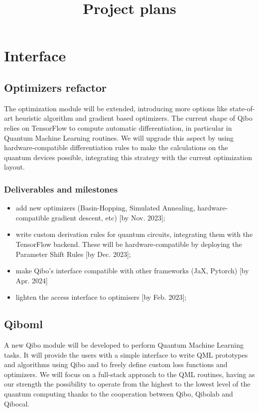 \documentclass[11pt]{article}
\title{Project plans}
\author{}
\date{}
\begin{document}
\maketitle
\tableofcontents

\section{Interface}

\subsection{Optimizers refactor}
The optimization module will be extended, introducing more options like state-of-art
heuristic algorithm and gradient based optimizers. The current shape of Qibo relies on 
TensorFlow to compute automatic differentiation, in particular in Quantum Machine 
Learning routines. We will upgrade this aspect by using hardware-compatible differentiation 
rules to make the calculations on the quantum devices possible, integrating this 
strategy with the current optimization layout.

\subsubsection*{Deliverables and milestones}
\begin{itemize}[noitemsep]
\item add new optimizers (Basin-Hopping, Simulated Annealing, hardware-compatible
gradient descent, etc) [by Nov. 2023];
\item write custom derivation rules for quantum circuits, integrating them with 
the TensorFlow backend. These will be hardware-compatible by deploying the 
Parameter Shift Rules [by Dec. 2023];
\item make Qibo's interface compatible with other frameworks (JaX, Pytorch) [by Apr. 2024]
\item lighten the access interface to optimisers [by Feb. 2023];
\end{itemize}

\subsection{Qiboml}
A new Qibo module will be developed to perform Quantum Machine Learning tasks. 
It will provide the users with a simple interface to write QML prototypes and algorithms
using Qibo and to freely define custom loss functions and optimizers. We will 
focus on a full-stack approach to the QML routines, having as our strength the possibility 
to operate from the highest to the lowest level of the quantum computing thanks 
to the cooperation between Qibo, Qibolab and Qibocal.
\end{document}
